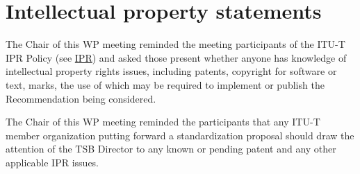 

\section{Intellectual property statements}\label{intellectual-property-statements}

The Chair of this WP meeting reminded the meeting participants of the ITU-T IPR Policy (see \href{https://www.itu.int/en/ITU-T/ipr/Pages/default.aspx}{IPR}) and asked those present whether anyone has knowledge of intellectual property rights issues, including patents, copyright for software or text, marks, the use of which may be required to implement or publish the Recommendation being considered.

The Chair of this WP meeting reminded the participants that any ITU-T member organization putting forward a standardization proposal should draw the attention of the TSB Director to any known or pending patent and any other applicable IPR issues.

\wpIPRStatements
